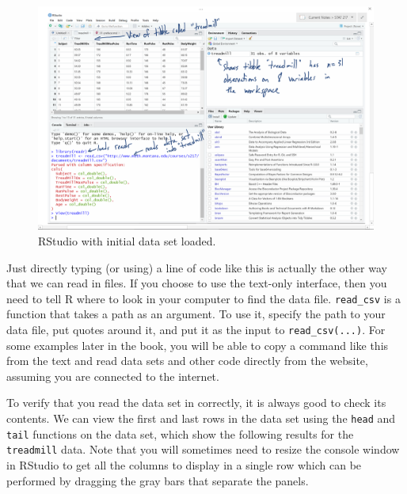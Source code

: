 \documentclass[
]{book}
\begin{document}
\begin{figure}[ht!]

{\centering \includegraphics[width=1\linewidth]{chapter1_files/fig1-3} 

}

\caption{RStudio with initial data set loaded.}\label{fig:Figure1-3}
\end{figure}

\indent Just directly typing (or using) a line of code like this is actually the
other way that we can read in
files. If you choose to use the text-only interface, then you need to tell R
where to look in your computer to find the data file. \texttt{read\_csv} is a
function that takes a path as an argument. To use it, specify the path to
your data file, put quotes around it, and put it as the input to
\texttt{read\_csv(...)}. For some examples later in the book, you will be able to
copy a command like this from the text and read data sets and other
code directly from the website, assuming you are connected to the
internet.

\indent To verify that you read the data set in correctly, it is always good to check
its contents. We can view the first and last rows in the data set using the
\texttt{head} and \texttt{tail} functions on the data set, which show the following
results for the
\texttt{treadmill} data. Note that you will sometimes need to resize the console
window in RStudio to get all the columns to display
in a single row which can be performed by dragging the gray bars that separate
the panels.

\small
\end{document}
